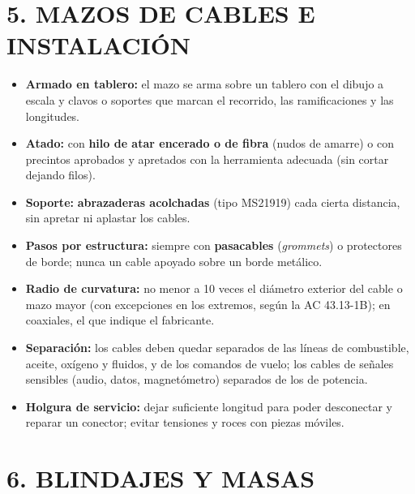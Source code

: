 \section*{5. MAZOS DE CABLES E INSTALACIÓN}

\begin{itemize}
  \item \textbf{Armado en tablero:} el mazo se arma sobre un tablero con el dibujo a escala y clavos
        o soportes que marcan el recorrido, las ramificaciones y las longitudes.
  \item \textbf{Atado:} con \textbf{hilo de atar encerado o de fibra} (nudos de amarre) o con
        precintos aprobados y apretados con la herramienta adecuada (sin cortar dejando filos).
  \item \textbf{Soporte:} \textbf{abrazaderas acolchadas} (tipo MS21919) cada cierta distancia,
        sin apretar ni aplastar los cables.
  \item \textbf{Pasos por estructura:} siempre con \textbf{pasacables} (\textit{grommets}) o
        protectores de borde; nunca un cable apoyado sobre un borde metálico.
  \item \textbf{Radio de curvatura:} no menor a 10 veces el diámetro exterior del cable o mazo mayor
        (con excepciones en los extremos, según la AC 43.13-1B); en coaxiales, el que indique el
        fabricante.
  \item \textbf{Separación:} los cables deben quedar separados de las líneas de combustible,
        aceite, oxígeno y fluidos, y de los comandos de vuelo; los cables de señales sensibles
        (audio, datos, magnetómetro) separados de los de potencia.
  \item \textbf{Holgura de servicio:} dejar suficiente longitud para poder desconectar y reparar
        un conector; evitar tensiones y roces con piezas móviles.
\end{itemize}

\section*{6. BLINDAJES Y MASAS}

